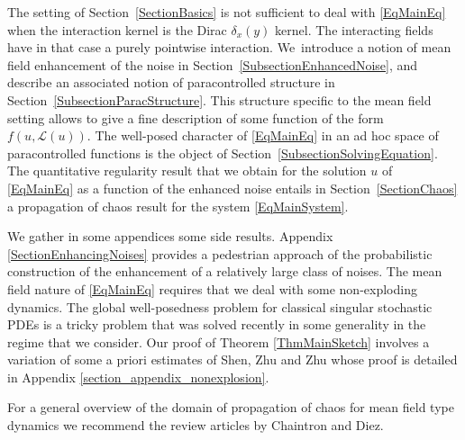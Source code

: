 \documentclass[10pt]{amsart}
\theoremstyle{definition}
\newcommand{\mcL}{\mathcal{L}}
\begin{document}
The setting of Section~\ref{SectionBasics} is not sufficient to deal with \eqref{EqMainEq} when the interaction kernel is the Dirac $\delta_x(y)$ kernel. The interacting fields have in that case a purely pointwise interaction. We~introduce a notion of mean field enhancement of the noise in Section~\ref{SubsectionEnhancedNoise}, and describe an associated notion of paracontrolled structure in Section~\ref{SubsectionParacStructure}. This structure specific to the mean field setting allows to give a fine description of some function of the form $f(u,\mcL(u))$. The well-posed character of \eqref{EqMainEq} in an ad hoc space of paracontrolled functions is the object of Section~\ref{SubsectionSolvingEquation}. The quantitative regularity result that we obtain for the solution $u$ of \eqref{EqMainEq} as a function of the enhanced noise entails in Section~\ref{SectionChaos} a propagation of chaos result for the system \eqref{EqMainSystem}.

We gather in some appendices some side results. Appendix \ref{SectionEnhancingNoises} provides a pedestrian approach of the probabilistic construction of the enhancement of a relatively large class of noises. The mean field nature of \eqref{EqMainEq} requires that we deal with some non-exploding dynamics. The global well-posedness problem for classical singular stochastic PDEs is a tricky problem that was solved recently in some generality in the regime that we consider. Our proof of Theorem \ref{ThmMainSketch} involves a variation of some a priori estimates of Shen, Zhu and Zhu \cite{ShenZhuZhu} whose proof is detailed in Appendix \ref{section_appendix_nonexplosion}.

For a general overview of the domain of propagation of chaos for mean field type dynamics we recommend the review articles \cite{ChaintronDiez1, ChaintronDiez2} by Chaintron and Diez.
\end{document}
